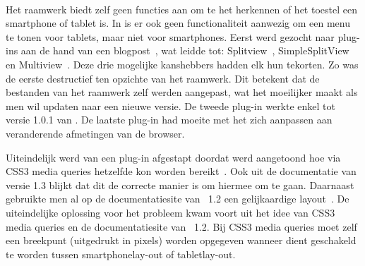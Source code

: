 

\paragraph{\jqm}
Het raamwerk biedt zelf geen functies aan om te het herkennen of het toestel een smartphone of tablet is.
In \jqm{} is er ook geen functionaliteit aanwezig om een menu te tonen voor tablets, maar niet voor smartphones. 
Eerst werd gezocht naar plug-ins aan de hand van een blogpost~\cite{Deering2012}, wat leidde tot: Splitview~\cite{Rahman2013}, SimpleSplitView~\cite{Yared2013} en Multiview~\cite{Franck2012}. 
Deze drie mogelijke kanshebbers hadden elk hun tekorten. 
Zo was de eerste destructief ten opzichte van het raamwerk. 
Dit betekent dat de bestanden van het raamwerk zelf werden aangepast, wat het moeilijker maakt als men wil updaten naar een nieuwe versie. 
De tweede plug-in werkte enkel tot versie 1.0.1 van \jqm{}. 
De laatste plug-in had moeite met het zich aanpassen aan veranderende afmetingen van de browser. 

Uiteindelijk werd van een plug-in afgestapt doordat werd aangetoond hoe via CSS3 media queries hetzelfde kon worden bereikt~\cite{Hadlock2012}. 
Ook uit de documentatie van versie 1.3 \cite{JQuery2013e} blijkt dat dit de correcte manier is om hiermee om te gaan.
Daarnaast gebruikte men al op de documentatiesite van \jqm{}~1.2 een gelijkaardige layout~\cite{JQuery2012b}. 
De uiteindelijke oplossing voor het probleem kwam voort uit het idee van CSS3 media queries en de documentatiesite van \jqm{}~1.2.
Bij CSS3 media queries moet zelf een breekpunt (uitgedrukt in pixels) worden opgegeven wanneer dient geschakeld te worden tussen smartphonelay-out of tabletlay-out.

